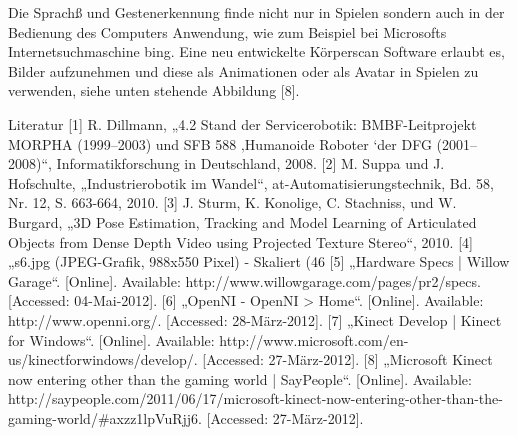 Die Sprachß und Gestenerkennung finde nicht nur in Spielen sondern auch in der Bedienung des Computers Anwendung, wie zum Beispiel bei Microsofts Internetsuchmaschine bing. Eine neu entwickelte Körperscan Software erlaubt es, Bilder aufzunehmen und diese als Animationen oder als Avatar in Spielen zu verwenden, siehe unten stehende Abbildung [8].



Literatur
[1]	 R. Dillmann, „4.2 Stand der Servicerobotik: BMBF-Leitprojekt MORPHA (1999–2003) und SFB 588 ‚Humanoide Roboter ‘der DFG (2001–2008)“, Informatikforschung in Deutschland, 2008.
[2]	 M. Suppa und J. Hofschulte, „Industrierobotik im Wandel“, at-Automatisierungstechnik, Bd. 58, Nr. 12, S. 663-664, 2010.
[3]	 J. Sturm, K. Konolige, C. Stachniss, und W. Burgard, „3D Pose Estimation, Tracking and Model Learning of Articulated Objects from Dense Depth Video using Projected Texture Stereo“, 2010.
[4]	„s6.jpg (JPEG-Grafik, 988x550 Pixel) - Skaliert (46%
[5]	„Hardware Specs | Willow Garage“. [Online]. Available: http://www.willowgarage.com/pages/pr2/specs. [Accessed: 04-Mai-2012].
[6]	„OpenNI - OpenNI > Home“. [Online]. Available: http://www.openni.org/. [Accessed: 28-März-2012].
[7]	„Kinect Develop | Kinect for Windows“. [Online]. Available: http://www.microsoft.com/en-us/kinectforwindows/develop/. [Accessed: 27-März-2012].
[8]	„Microsoft Kinect now entering other than the gaming world | SayPeople“. [Online]. Available: http://saypeople.com/2011/06/17/microsoft-kinect-now-entering-other-than-the-gaming-world/#axzz1lpVuRjj6. [Accessed: 27-März-2012].

